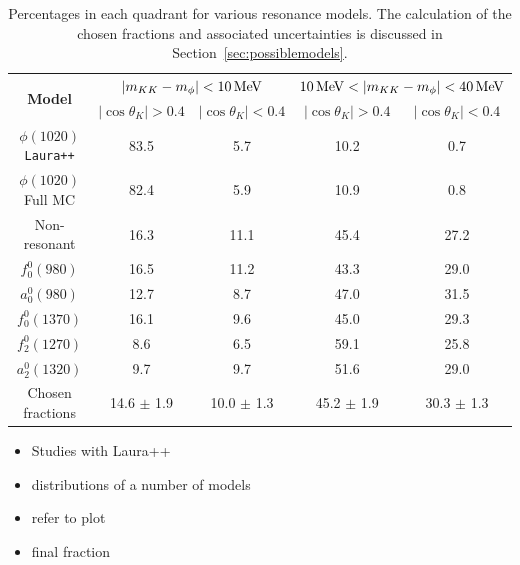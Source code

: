 \begin{table}[!ht]
   \centering
   \begin{tabular}{ c  c  c  c  c }

      \hline
      \multirow{ 2}{*}{\textbf{Model }} & \multicolumn{2}{c}{$|m_{KK}-m_\phi|<10\mathrm{\,Me\kern -0.1em V} $} & \multicolumn{2}{c}{$10\mev<|m_{KK}-m_\phi|<40\mev$} \\
         & $|\cos{\theta_{K}}|>0.4$ & $|\cos{\theta_{K}}|<0.4$ & $|\cos{\theta_{K}}|>0.4$ & $|\cos{\theta_{K}}|<0.4$ \\
      \hline 
      $\phi(1020)$ \texttt{Laura++}  & 83.5  &  5.7  & 10.2  &  0.7   \\
      $\phi(1020)$ Full  MC          & 82.4  &  5.9  & 10.9  &  0.8   \\
      \hline
      Non-resonant                   & 16.3  & 11.1  & 45.4  & 27.2   \\
      $f_{0}^{0}(980)$               & 16.5  & 11.2  & 43.3  & 29.0   \\
      $a_{0}^{0}(980)$               & 12.7  &  8.7  & 47.0  & 31.5   \\
      $f_{0}^{0}(1370)$              & 16.1  &  9.6  & 45.0  & 29.3   \\
      $f_{2}^{0}(1270)$              &  8.6  &  6.5  & 59.1  & 25.8   \\
      $a_{2}^{0}(1320)$              &  9.7  &  9.7  & 51.6  & 29.0   \\
      \hline
      Chosen fractions              & 14.6 $\pm$ 1.9  & 10.0 $\pm$ 1.3  & 45.2 $\pm$ 1.9  & 30.3 $\pm$ 1.3   \\
      \hline
   \end{tabular}
   \caption{Percentages in each quadrant for various resonance models. The calculation of the chosen fractions and associated uncertainties is discussed in Section~\ref{sec:possiblemodels}. }
   \label{table:rescfracs}
\end{table}




{\color{Red}
\begin{itemize}
\item Studies with Laura++
\item distributions of a number of models
\item refer to \Dsp\Kp\Km plot
\item final fraction
\end{itemize}
}




